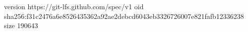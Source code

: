 version https://git-lfs.github.com/spec/v1
oid sha256:f31c2476a6e8526435362a92ae2debcd6043eb3326726007e821fafb12336238
size 190643
